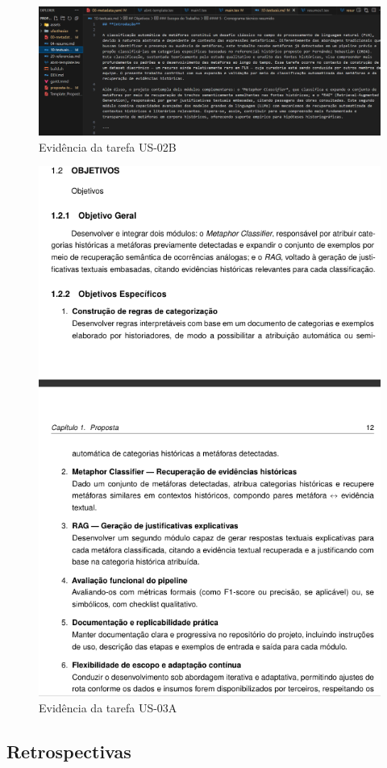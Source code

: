 \begin{figure}[htbp]
  \centering
  \includegraphics[width=0.6\linewidth]{pictures/intro_rascunho.png}
  \caption{Evidência da tarefa US-02B}
\end{figure}

\begin{figure}[htbp]
  \centering
  \includegraphics[width=0.6\linewidth]{pictures/problema_objetivos.png}
  \caption{Evidência da tarefa US-03A}
\end{figure}



\subsection{Retrospectivas}

